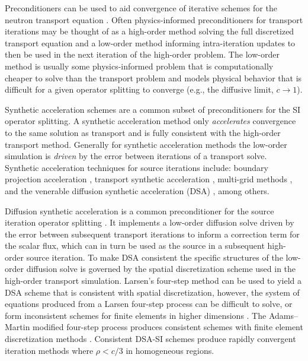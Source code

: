 Preconditioners can be used to aid convergence of iterative schemes for the neutron transport equation \cite{adams_fast_2002}.
Often physics-informed preconditioners for transport iterations may be thought of as a high-order method solving the full discretized transport equation and a low-order method informing intra-iteration updates to then be used in the next iteration of the high-order problem.
The low-order method is usually some physics-informed problem that is computationally cheaper to solve than the transport problem and models physical behavior that is difficult for a given operator splitting to converge (e.g., the diffusive limit, $c\rightarrow1$).

Synthetic acceleration schemes are a common subset of preconditioners for the SI operator splitting.
A synthetic acceleration method only \textit{accelerates} convergence to the same solution as transport and is fully consistent with the high-order transport method.
Generally for synthetic acceleration methods the low-order simulation is \textit{driven} by the error between iterations of a transport solve.
Synthetic acceleration techniques for source iterations include:
boundary projection acceleration \cite{adams_boundary_1988}, 
transport synthetic acceleration \cite{ramone_1997_tsa},
multi-grid methods \cite{man1994parallel},
and the venerable diffusion synthetic acceleration (DSA) \cite{larsen_1983_dsaforsn}, among others.

Diffusion synthetic acceleration is a common preconditioner for the source iteration operator splitting \cite{adams_fast_2002, alcouffe_1977_dd, coale_2025_dsa}.
It implements a low-order diffusion solve driven by the error between subsequent transport iterations to inform a correction term for the scalar flux, which can in turn be used as the source in a subsequent high-order source iteration.
To make DSA consistent the specific structures of the low-order diffusion solve is governed by the spatial discretization scheme used in the high-order transport simulation.
Larsen's four-step method can be used to yield a DSA scheme that is consistent with spatial discretization, however, the system of equations produced from a Larsen four-step process can be difficult to solve, or form inconsistent schemes for finite elements in higher dimensions \cite{larsen_1982_unconDSA, larsen_1982_unconDSAte, haut_2020_dsa}. 
The Adams--Martin modified four-step process produces consistent schemes with finite element discretization methods \cite{adams_1992_dsadfe}.
Consistent DSA-SI schemes produce rapidly convergent iteration methods where $\rho<c/3$ in homogeneous regions.

